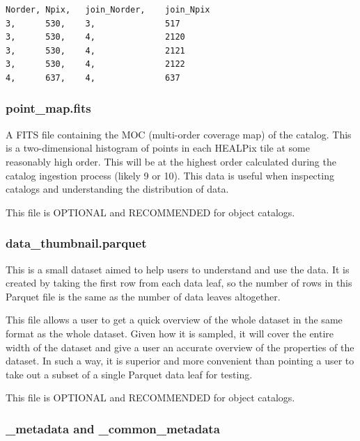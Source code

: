 \documentclass[11pt,a4paper]{ivoa}
\begin{document}
\begin{minipage}{\linewidth}
\begin{lstlisting}[caption=Example \texttt{partition\_join\_info.csv} file contents, label=fig:examplePartitionJoinInfoCsv]    
Norder,	Npix,   join_Norder,    join_Npix
3,      530,    3,              517
3,      530,    4,              2120
3,      530,    4,              2121
3,      530,    4,              2122
4,      637,    4,              637
\end{lstlisting}
\end{minipage}

\subsubsection{point\_map.fits} 

A FITS file containing the MOC (multi-order coverage map) of the catalog.
This is a two-dimensional histogram of points in each HEALPix tile at some reasonably high order.
This will be at the highest order calculated during the catalog ingestion process (likely 9 or 10). 
This data is useful when inspecting catalogs and understanding the distribution of data. 

This file is OPTIONAL and RECOMMENDED for object catalogs.

\subsubsection{data\_thumbnail.parquet} 
This is a small dataset aimed to help users to understand and use the data. 
It is created by taking the first row from each data leaf, so the number of rows in this Parquet file is the same as the number of data leaves altogether. \par

This file allows a user to get a quick overview of the whole dataset in the same format as the whole dataset. 
Given how it is sampled, it will cover the entire width of the dataset and give a user an accurate overview of the properties of the dataset. 
In such a way, it is superior and more convenient than pointing a user to take out a subset of a single Parquet data leaf for testing. 

This file is OPTIONAL and RECOMMENDED for object catalogs.

\subsubsection{\_metadata and \_common\_metadata} 
\end{document}
